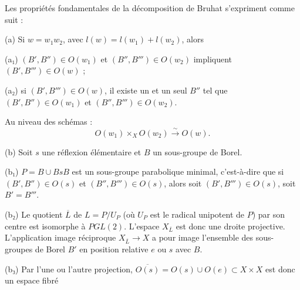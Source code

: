 \documentclass[9pt,twoside]{extarticle}
\begin{document}
{Les propriétés fondamentales de la décomposition de Bruhat s'expriment comme suit :\par

(a) Si \(w=w_1w_2\), avec \(l(w)=l(w_1)+l(w_2)\), alors\par

(a₁) \((B',B'')\in O(w_1)\) et \((B'',B''')\in O(w_2)\) impliquent \((B',B''')\in O(w)\) ;\par

(a₂) si \((B',B''')\in O(w)\), il existe un et un seul \(B''\) tel que \((B',B'')\in O(w_1)\) et \((B'',B''')\in O(w_2)\).\par

Au niveau des schémas : \[
O(w_1)\times_X O(w_2)\xrightarrow{\sim}O(w).
\]\par

(b) Soit \(s\) une réflexion élémentaire et \(B\) un sous-groupe de Borel.\par

(b₁) \(P=B\cup BsB\) est un sous-groupe parabolique minimal, c'est-à-dire que si \((B',B'')\in O(s)\) et \((B'',B''')\in O(s)\), alors soit \((B',B''')\in O(s)\), soit \(B'=B'''\).\par

(b₂) Le quotient \(\overline{L}\) de \(L=P/U_P\) (où \(U_P\) est le radical unipotent de \(P\)) par son centre est isomorphe à \(PGL(2)\). L'espace \(X_{\overline{L}}\) est donc une droite projective. L'application image réciproque \(X_{\overline{L}}\to X\) a pour image l'ensemble des sous-groupes de Borel \(B'\) en position relative \(e\) ou \(s\) avec \(B\).\par

(b₃) Par l'une ou l'autre projection, \(\overline{O(s)}=O(s)\cup O(e)\subset X\times X\) est donc un espace fibré\par
}
\end{document}
